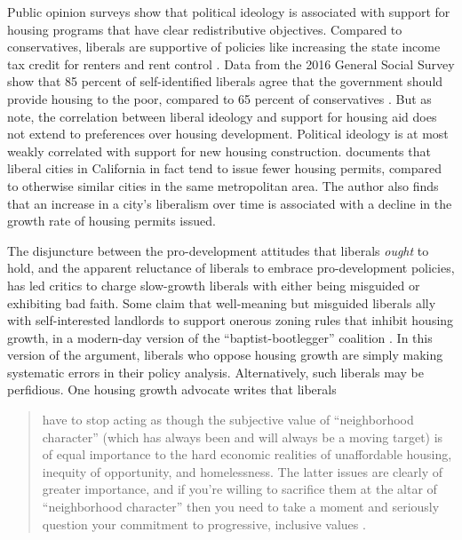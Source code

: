 \documentclass[article,11pt]{memoir}
\begin{document}
Public opinion surveys show that political ideology is associated with support for housing programs that have clear redistributive objectives.  Compared to conservatives, liberals are supportive of policies like increasing the state income tax credit for renters and rent control \citep{marble_where_2018}.  Data from the 2016 General Social Survey show that 85 percent of self-identified liberals agree that the government should provide housing to the poor, compared to 65 percent of conservatives \citep{smith_general_2016}.  But as \cite{marble_where_2018} note, the correlation between liberal ideology and support for housing aid does not extend to preferences over housing development.  Political ideology is at most weakly correlated with support for new housing construction. \cite{kahn_liberal_2011} documents that liberal cities in California in fact tend to issue fewer housing permits, compared to otherwise similar cities in the same metropolitan area.  The author also finds that an increase in a city's liberalism over time is associated with a decline in the growth rate of housing permits issued.  

The disjuncture between the pro-development attitudes that liberals \emph{ought} to hold, and the apparent reluctance of liberals to embrace pro-development policies, has led critics to charge slow-growth liberals with either being misguided or exhibiting bad faith.  Some claim that well-meaning but misguided liberals ally with self-interested landlords to support onerous zoning rules that inhibit housing growth, in a modern-day version of the ``baptist-bootlegger'' coalition \citep{somin_opinion_2017}. In this version of the argument, liberals who oppose housing growth are simply making systematic errors in their policy analysis.  Alternatively, such liberals may be perfidious. One housing growth advocate writes that liberals
\begin{quote}
have to stop acting as though the subjective value of ``neighborhood character'' (which has always been and will always be a moving target) is of equal importance to the hard economic realities of unaffordable housing, inequity of opportunity, and homelessness. The latter issues are clearly of greater importance, and if you're willing to sacrifice them at the altar of ``neighborhood character'' then you need to take a moment and seriously question your commitment to progressive, inclusive values \citep{phillips_disconnect_2016}.
\end{quote}
\end{document}
